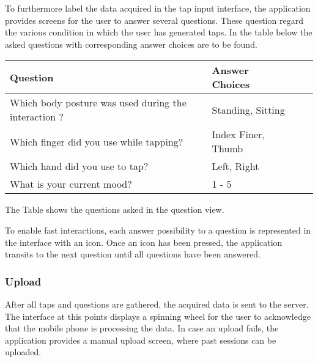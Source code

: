 To furthermore label the data acquired in the tap input interface, the application provides screens for the user to answer several questions. These question regard the various condition in which the user has generated taps. In the table below the asked questions with corresponding answer choices are to be found.

\begin{center}
  \begin{tabular}{| l | l | l | l |}
  \hline
  \textbf{Question} & \textbf{Answer Choices} \\ \hline
  Which body posture was used during the interaction ? & Standing, Sitting \\
  Which finger did you use while tapping? & Index Finer, Thumb \\
  Which hand did you use to tap? & Left, Right \\
  What is your current mood? & 1 - 5 \\
  \hline
  \end{tabular}
  \caption{The Table shows the questions asked in the question view.}
\end{center}

To enable fast interactions, each answer possibility to a question is represented in the interface with an icon. Once an icon has been pressed, the application transits to the next question until all questions have been answered.


\subsubsection{Upload}
After all taps and questions are gathered, the acquired data is sent to the server. The interface at this points displays a spinning wheel for the user to acknowledge that the mobile phone is processing the data. In case an upload fails, the application provides a manual upload screen, where past sessions can be uploaded.


